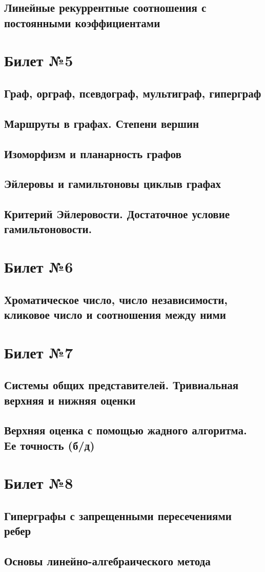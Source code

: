 \documentclass[a4paper]{article}
\begin{document}
\subsection{Линейные рекуррентные соотношения с постоянными коэффициентами}

\section{Билет №5}
\subsection{Граф, орграф, псевдограф, мультиграф, гиперграф}
\subsection{Маршруты в графах. Степени вершин}
\subsection{Изоморфизм и планарность графов}
\subsection{Эйлеровы и гамильтоновы циклыв графах}
\subsection{Критерий Эйлеровости. Достаточное условие гамильтоновости.}

\section{Билет №6}
\subsection{Хроматическое число, число независимости, кликовое число и соотношения между ними}

\section{Билет №7}
\subsection{Системы общих представителей. Тривиальная верхняя и нижняя оценки}
\subsection{Верхняя оценка с помощью жадного алгоритма. Ее точность (б/д)}

\section{Билет №8}
\subsection{Гиперграфы с запрещенными пересечениями ребер}
\subsection{Основы линейно-алгебраического метода}
\end{document}
